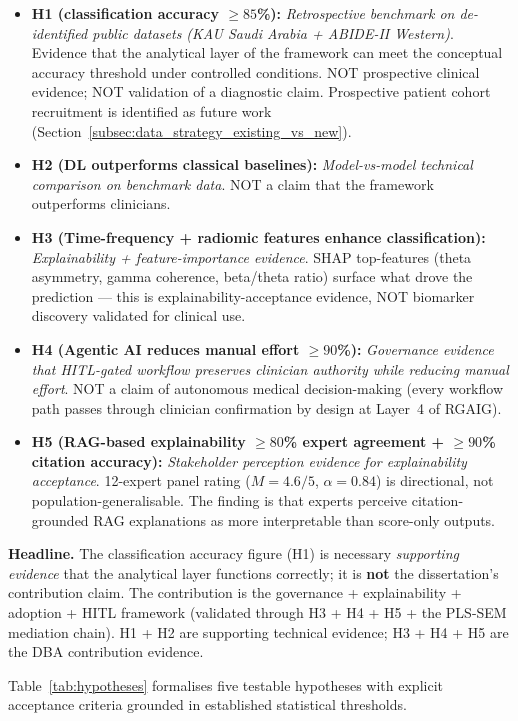 \begin{itemize}[leftmargin=*, itemsep=3pt]
    \item \textbf{H1 (classification accuracy $\geq 85$\%):} \emph{Retrospective benchmark on de-identified public datasets (KAU Saudi Arabia + ABIDE-II Western)}. Evidence that the analytical layer of the framework can meet the conceptual accuracy threshold under controlled conditions. NOT prospective clinical evidence; NOT validation of a diagnostic claim. Prospective patient cohort recruitment is identified as future work (Section~\ref{subsec:data_strategy_existing_vs_new}).
    \item \textbf{H2 (DL outperforms classical baselines):} \emph{Model-vs-model technical comparison on benchmark data}. NOT a claim that the framework outperforms clinicians.
    \item \textbf{H3 (Time-frequency + radiomic features enhance classification):} \emph{Explainability + feature-importance evidence}. SHAP top-features (theta asymmetry, gamma coherence, beta/theta ratio) surface what drove the prediction --- this is explainability-acceptance evidence, NOT biomarker discovery validated for clinical use.
    \item \textbf{H4 (Agentic AI reduces manual effort $\geq 90$\%):} \emph{Governance evidence that HITL-gated workflow preserves clinician authority while reducing manual effort}. NOT a claim of autonomous medical decision-making (every workflow path passes through clinician confirmation by design at Layer~4 of RGAIG).
    \item \textbf{H5 (RAG-based explainability $\geq 80$\% expert agreement + $\geq 90$\% citation accuracy):} \emph{Stakeholder perception evidence for explainability acceptance}. 12-expert panel rating ($M = 4.6/5$, $\alpha = 0.84$) is directional, not population-generalisable. The finding is that experts perceive citation-grounded RAG explanations as more interpretable than score-only outputs.
\end{itemize}

\noindent\textbf{Headline.} The classification accuracy figure (H1) is necessary \emph{supporting evidence} that the analytical layer functions correctly; it is \textbf{not} the dissertation's contribution claim. The contribution is the governance + explainability + adoption + HITL framework (validated through H3 + H4 + H5 + the PLS-SEM mediation chain). H1 + H2 are supporting technical evidence; H3 + H4 + H5 are the DBA contribution evidence.

Table~\ref{tab:hypotheses} formalises five testable hypotheses with explicit acceptance criteria grounded in established statistical thresholds.

